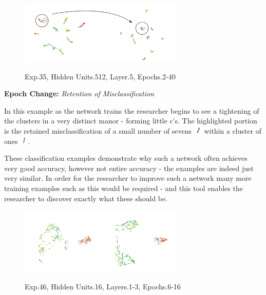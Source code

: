 \documentclass[a4paper,11pt,titlepage]{article}
\begin{document}
	\begin{figure}[H]
    			\centering	
			{{\includegraphics[width=0.7\textwidth]
    				{img/conc_X35_H512_L5_E2-40.png} 
    			}}%
    			\caption{Exp.35, Hidden Units.512, Layer.5, Epochs.2-40}%
    		\label{fig:mnistHinton}
	\end{figure}
	
	\textbf{Epoch Change:} \textit{Retention of Misclassification}
	\par 
	In this example as the network trains the researcher begins to see a tightening of the clusters in a very distinct manor - forming little c's. The highlighted portion is the retained misclassification of a small number of sevens {\includegraphics[width=0.4cm]{img/seven_one-01.png}}  within a cluster of ones {\includegraphics[width=0.4cm]{img/seven_one-02.png}}.
	\par 
	These classification examples demonstrate why such a network often achieves very good accuracy, however not entire accuracy - the examples are indeed just very similar. In order for the researcher to improve such a network many more training examples such as this would be required - and this tool enables the researcher to discover exactly what these should be.

	\begin{figure}[H]
    			\centering	
			{{\includegraphics[width=0.7\textwidth]
    				{img/conc_X46_H16_L1-3_E6-16.png} 
    			}}%
    			\caption{Exp.46, Hidden Units.16, Layers.1-3, Epochs.6-16}%
    		\label{fig:mnistHinton}
	\end{figure}
	
\end{document}
